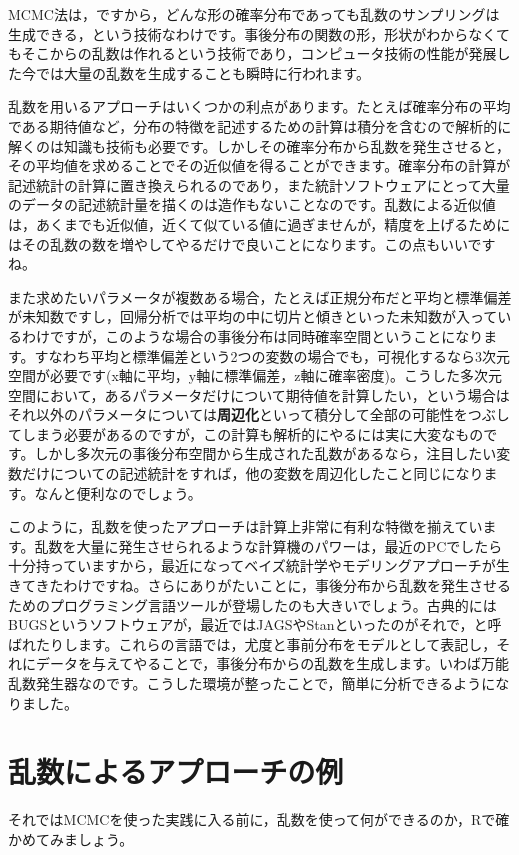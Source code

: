 \documentclass{ltjsbook}
\begin{document}
MCMC法は，ですから，どんな形の確率分布であっても乱数のサンプリングは生成できる，という技術なわけです。事後分布の関数の形，形状がわからなくてもそこからの乱数は作れるという技術であり，コンピュータ技術の性能が発展した今では大量の乱数を生成することも瞬時に行われます。

乱数を用いるアプローチはいくつかの利点があります。たとえば確率分布の平均である期待値など，分布の特徴を記述するための計算は積分を含むので解析的に解くのは知識も技術も必要です。しかしその確率分布から乱数を発生させると，その平均値を求めることでその近似値を得ることができます。確率分布の計算が記述統計の計算に置き換えられるのであり，また統計ソフトウェアにとって大量のデータの記述統計量を描くのは造作もないことなのです。乱数による近似値は，あくまでも近似値，近くて似ている値に過ぎませんが，精度を上げるためにはその乱数の数を増やしてやるだけで良いことになります。この点もいいですね。

また求めたいパラメータが複数ある場合，たとえば正規分布だと平均と標準偏差が未知数ですし，回帰分析では平均の中に切片と傾きといった未知数が入っているわけですが，このような場合の事後分布は同時確率空間ということになります。すなわち平均と標準偏差という2つの変数の場合でも，可視化するなら3次元空間が必要です(x軸に平均，y軸に標準偏差，z軸に確率密度)。こうした多次元空間において，あるパラメータだけについて期待値を計算したい，という場合はそれ以外のパラメータについては\textbf{周辺化}といって積分して全部の可能性をつぶしてしまう必要があるのですが，この計算も解析的にやるには実に大変なものです。しかし多次元の事後分布空間から生成された乱数があるなら，注目したい変数だけについての記述統計をすれば，他の変数を周辺化したこと同じになります。なんと便利なのでしょう。

このように，乱数を使ったアプローチは計算上非常に有利な特徴を揃えています。乱数を大量に発生させられるような計算機のパワーは，最近のPCでしたら十分持っていますから，最近になってベイズ統計学やモデリングアプローチが生きてきたわけですね。さらにありがたいことに，事後分布から乱数を発生させるためのプログラミング言語ツールが登場したのも大きいでしょう。古典的にはBUGSというソフトウェアが，最近ではJAGSやStanといったのがそれで，と呼ばれたりします。これらの言語では，尤度と事前分布をモデルとして表記し，それにデータを与えてやることで，事後分布からの乱数を生成します。いわば万能乱数発生器なのです。こうした環境が整ったことで，簡単に分析できるようになりました。

\section{乱数によるアプローチの例}
それではMCMCを使った実践に入る前に，乱数を使って何ができるのか，Rで確かめてみましょう。
\end{document}
